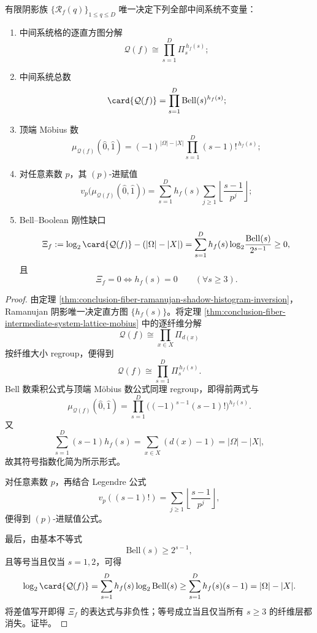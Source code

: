 \begin{theorem}\label{thm:conclusion-fiber-ramanujan-shadow-bell-mobius-completeness}
有限阴影族 \(\{\mathscr R_f(q)\}_{1\le q\le D}\) 唯一决定下列全部中间系统不变量：
\begin{enumerate}
\normalfont
  \item 中间系统格的逐直方图分解
  \[
  \mathcal Q(f)\cong \prod_{s=1}^{D}\Pi_s^{\,h_f(s)};
  \]
  \item 中间系统总数
  \[
  \card{\mathcal Q(f)}=\prod_{s=1}^{D}\mathrm{Bell}(s)^{h_f(s)};
  \]
  \item 顶端 Möbius 数
  \[
  \mu_{\mathcal Q(f)}(\hat 0,\hat 1)
  =
  (-1)^{|\Omega|-|X|}
  \prod_{s=1}^{D}(s-1)!^{\,h_f(s)};
  \]
  \item 对任意素数 \(p\)，其 \((p)\)-进赋值
  \[
  v_p\!\bigl(\mu_{\mathcal Q(f)}(\hat 0,\hat 1)\bigr)
  =
  \sum_{s=1}^{D}h_f(s)\sum_{j\ge 1}\left\lfloor\frac{s-1}{p^j}\right\rfloor;
  \]
  \item Bell--Boolean 刚性缺口
  \[
  \Xi_f:=
  \log_2\card{\mathcal Q(f)}-(|\Omega|-|X|)
  =
  \sum_{s=1}^{D}h_f(s)\log_2\!\frac{\mathrm{Bell}(s)}{2^{s-1}}
  \ge 0,
  \]
  且
  \[
  \Xi_f=0
  \iff
  h_f(s)=0\qquad(\forall s\ge 3).
  \]
\end{enumerate}
\end{theorem}
\begin{proof}
由定理 \ref{thm:conclusion-fiber-ramanujan-shadow-histogram-inversion}，Ramanujan 阴影唯一决定直方图 \(\{h_f(s)\}\)。将定理 \ref{thm:conclusion-fiber-intermediate-system-lattice-mobius} 中的逐纤维分解
\[
\mathcal Q(f)\cong \prod_{x\in X}\Pi_{d(x)}
\]
按纤维大小 regroup，便得到
\[
\mathcal Q(f)\cong \prod_{s=1}^{D}\Pi_s^{\,h_f(s)}.
\]
Bell 数乘积公式与顶端 Möbius 数公式同理 regroup，即得前两式与
\[
\mu_{\mathcal Q(f)}(\hat 0,\hat 1)
=
\prod_{s=1}^{D}\bigl((-1)^{s-1}(s-1)!\bigr)^{h_f(s)}.
\]
又
\[
\sum_{s=1}^{D}(s-1)h_f(s)
=
\sum_{x\in X}(d(x)-1)
=
|\Omega|-|X|,
\]
故其符号指数化简为所示形式。

对任意素数 \(p\)，再结合 Legendre 公式
\[
v_p((s-1)!)=\sum_{j\ge 1}\left\lfloor\frac{s-1}{p^j}\right\rfloor,
\]
便得到 \((p)\)-进赋值公式。

最后，由基本不等式
\[
\mathrm{Bell}(s)\ge 2^{s-1},
\]
且等号当且仅当 \(s=1,2\)，可得
\[
\log_2\card{\mathcal Q(f)}
=
\sum_{s=1}^{D}h_f(s)\log_2\mathrm{Bell}(s)
\ge
\sum_{s=1}^{D}h_f(s)(s-1)
=
|\Omega|-|X|.
\]
将差值写开即得 \(\Xi_f\) 的表达式与非负性；等号成立当且仅当所有 \(s\ge 3\) 的纤维层都消失。证毕。
\end{proof}

